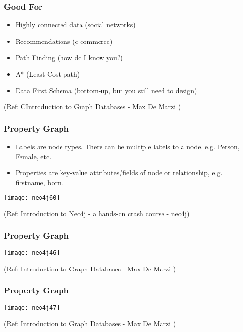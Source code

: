\begin{frame}\frametitle{Good For}

\begin{itemize}
\item Highly connected data (social networks)
\item Recommendations (e-commerce)
\item Path Finding (how do I know you?)
\item A* (Least Cost path)
\item  Data First Schema (bottom-up, but you still need to design)
\end{itemize}

{\tiny (Ref: CIntroduction to Graph Databases - Max De Marzi )}
\end{frame}


\begin{frame}\frametitle{Property Graph}

\begin{itemize}
\item Labels are node types. There can be multiple labels to a node, e.g. Person, Female, etc.
\item Properties are key-value attributes/fields of node or relationship, e.g. firstname, born.

\end{itemize}
\begin{center}
\texttt{[image: neo4j60]}
\end{center}	

{\tiny (Ref: Introduction to Neo4j - a hands-on crash course - neo4j)}
\end{frame}


\begin{frame}\frametitle{Property Graph}

\begin{center}
\texttt{[image: neo4j46]}
\end{center}	

{\tiny (Ref: Introduction to Graph Databases - Max De Marzi )}
\end{frame}

\begin{frame}\frametitle{Property Graph}

\begin{center}
\texttt{[image: neo4j47]}
\end{center}	

{\tiny (Ref: Introduction to Graph Databases - Max De Marzi )}
\end{frame}

